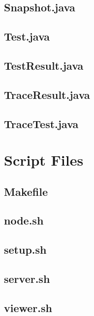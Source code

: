 \documentclass[a4wide,12pt]{article}
\begin{document}
\subsection{Snapshot.java}



\subsection{Test.java}



\subsection{TestResult.java}



\subsection{TraceResult.java}



\subsection{TraceTest.java}



\section{Script Files}

\subsection{Makefile}



\subsection{node.sh}



\subsection{setup.sh}



\subsection{server.sh}



\subsection{viewer.sh}


\end{document}
